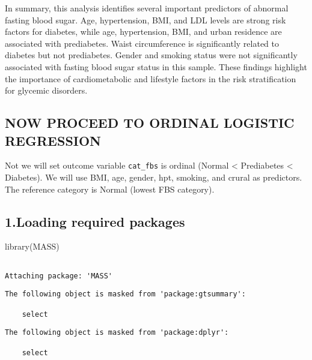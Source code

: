\documentclass[
  letterpaper,
  DIV=11,
  numbers=noendperiod]{scrartcl}
\newenvironment{Shaded}{\begin{snugshade}}{\end{snugshade}}
\newcommand{\FunctionTok}[1]{\textcolor[rgb]{0.28,0.35,0.67}{#1}}
\newcommand{\NormalTok}[1]{\textcolor[rgb]{0.00,0.23,0.31}{#1}}
\begin{document}
In summary, this analysis identifies several important predictors of
abnormal fasting blood sugar. Age, hypertension, BMI, and LDL levels are
strong risk factors for diabetes, while age, hypertension, BMI, and
urban residence are associated with prediabetes. Waist circumference is
significantly related to diabetes but not prediabetes. Gender and
smoking status were not significantly associated with fasting blood
sugar status in this sample. These findings highlight the importance of
cardiometabolic and lifestyle factors in the risk stratification for
glycemic disorders.

\subsection{\texorpdfstring{\textbf{NOW PROCEED TO ORDINAL LOGISTIC
REGRESSION}}{NOW PROCEED TO ORDINAL LOGISTIC REGRESSION}}\label{now-proceed-to-ordinal-logistic-regression}

Not we will set outcome variable \texttt{cat\_fbs} is ordinal (Normal
\textless{} Prediabetes \textless{} Diabetes). We will use BMI, age,
gender, hpt, smoking, and crural as predictors. The reference category
is Normal (lowest FBS category).

\subsection{1.Loading required
packages}\label{loading-required-packages}

\begin{Shaded}
\begin{Highlighting}[]
\FunctionTok{library}\NormalTok{(MASS)}
\end{Highlighting}
\end{Shaded}

\begin{verbatim}

Attaching package: 'MASS'
\end{verbatim}

\begin{verbatim}
The following object is masked from 'package:gtsummary':

    select
\end{verbatim}

\begin{verbatim}
The following object is masked from 'package:dplyr':

    select
\end{verbatim}
\end{document}
